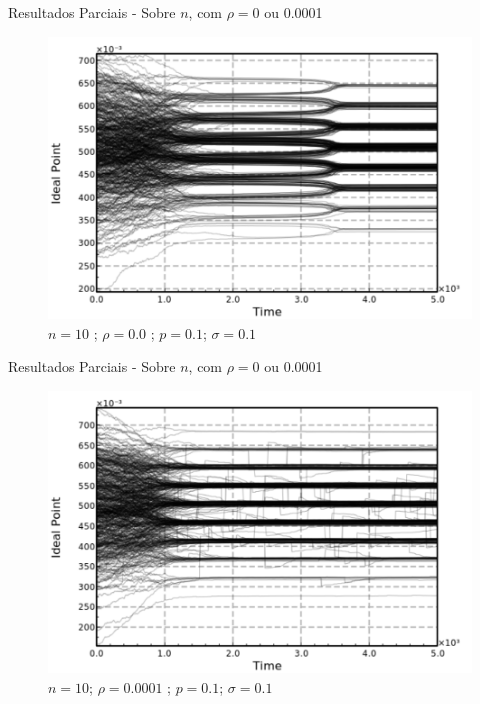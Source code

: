 \documentclass{beamer}
\begin{document}
\begin{frame}{Resultados Parciais - Sobre \(n\), com \(\rho = 0 \) ou 0.0001}
  \begin{figure}[H]
    \centering
    \includegraphics[scale = 0.5]{ims/n10p(01)sigma(01)rho(00).pdf}
    \caption{\(n = 10\) ; \(\rho = 0.0\)  ; \(p = 0.1\); \(\sigma = 0.1\) }
  \end{figure}
\end{frame}

\begin{frame}{Resultados Parciais - Sobre \(n\), com \(\rho = 0 \) ou 0.0001}
  \begin{figure}[H]
    \centering
    \includegraphics[scale = 0.5]{ims/n10p(01)sigma(01)rho(00001).pdf}
    \caption{ \(n = 10 \); \(\rho = 0.0001\)  ; \(p = 0.1\); \(\sigma = 0.1\) }
  \end{figure}
\end{frame}
\end{document}
